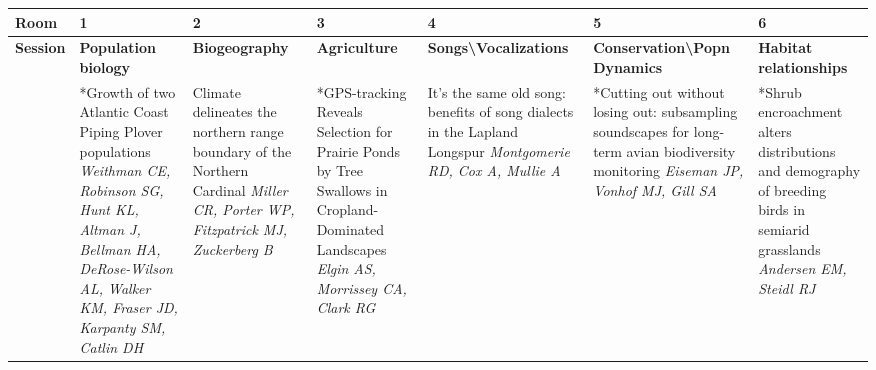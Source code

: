 \begin{tabular}{|x{0.75cm}|x{2.25cm}|x{2.25cm}|x{2.25cm}|x{2.25cm}|x{2.25cm}|x{2.25cm}|}\hline
Room & 1 & 2 & 3 & 4 & 5 & 6\\
\hline
\rule{0pt}{1em} \textbf{Session} &\footnotesize \textbf{Population biology} & \footnotesize \textbf{Biogeography} & \footnotesize \textbf{Agriculture} & \footnotesize \textbf{Songs\textbackslash Vocalizations} & \footnotesize \textbf{Conservation\textbackslash Popn Dynamics} & \footnotesize \textbf{Habitat relationships}\\
\hline
{}&*Growth of two Atlantic Coast Piping Plover populations \newline \newline \textit{Weithman CE, Robinson SG, Hunt KL, Altman J, Bellman HA, DeRose-Wilson AL, Walker KM, Fraser JD, Karpanty SM, Catlin DH} & Climate delineates the northern range boundary of the Northern Cardinal \newline \newline \textit{Miller CR, Porter WP, Fitzpatrick MJ, Zuckerberg B} & *GPS-tracking Reveals Selection for Prairie Ponds by Tree Swallows in Cropland-Dominated Landscapes \newline \newline \textit{Elgin AS, Morrissey CA, Clark RG} & It's the same old song: benefits of song dialects in the Lapland Longspur \newline \newline \textit{Montgomerie RD, Cox A, Mullie A} & *Cutting out without losing out: subsampling soundscapes for long-term avian biodiversity monitoring \newline \newline \textit{Eiseman JP, Vonhof MJ, Gill SA} & *Shrub encroachment alters distributions and demography of breeding birds in semiarid grasslands \newline \newline \textit{Andersen EM, Steidl RJ}\\
\hline

\end{tabular}
